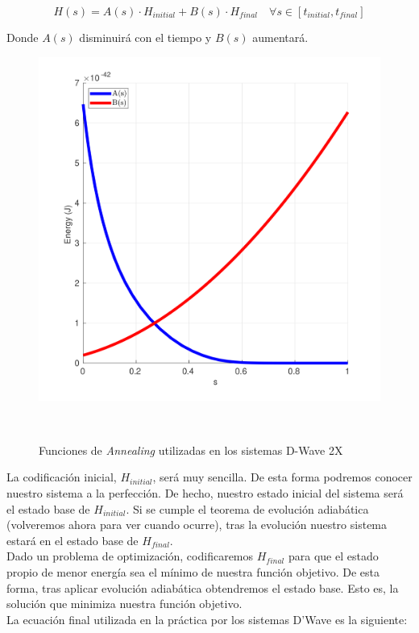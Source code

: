 \documentclass[11pt]{article}
\begin{document}
\[ H(s) = A(s) \cdot H_{initial} + B(s) \cdot H_{final} \quad \forall s \in [t_{initial}, t_{final}] \]

Donde $A(s)$ disminuirá con el tiempo y $B(s)$ aumentará.

\begin{figure}[H]
	\includegraphics[scale=.14]{figures/dwave-annealing-functions}
	\centering
	\caption{Funciones de \emph{Annealing} utilizadas en los sistemas D-Wave 2X}\
\end{figure}

La codificación inicial, $H_{initial}$, será muy sencilla. De esta forma podremos conocer nuestro sistema a la perfección. De hecho, nuestro estado inicial del sistema será el estado base de $H_{initial}$. Si se cumple el teorema de evolución adiabática (volveremos ahora para ver cuando ocurre), tras la evolución nuestro sistema estará en el estado base de $H_{final}$. \\

Dado un problema de optimización, codificaremos $H_{final}$ para que el estado propio de menor energía sea el mínimo de nuestra función objetivo. De esta forma, tras aplicar evolución adiabática obtendremos el estado base. Esto es, la solución que minimiza nuestra función objetivo. \\

La ecuación final utilizada en la práctica por los sistemas D'Wave es la siguiente:
\end{document}
